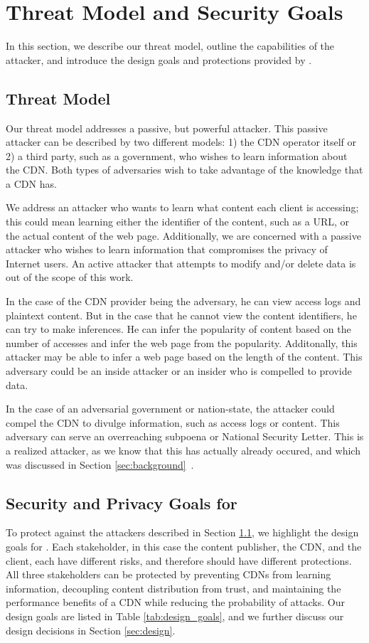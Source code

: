 \section{Threat Model and Security Goals}
\label{sec:threat}
In this section, we describe our threat model, outline the capabilities of the 
attacker, and introduce the design goals and protections provided by \system{}.

\subsection{Threat Model}
\label{sec:attacker}
Our threat model addresses a passive, but powerful attacker.  This passive attacker can 
be described by two different models: 1) the CDN operator itself or 2) a third party, such 
as a government, who wishes to learn information about the CDN. 
Both types of adversaries wish to take advantage of the knowledge that a CDN has.  

We address an attacker who wants to learn what content each client is accessing; this 
could mean learning either the identifier of the content, such as a URL, or the actual 
content of the web page.  Additionally, we are concerned with a passive attacker who 
wishes to learn information that compromises the privacy of Internet 
users.  An active attacker that attempts to modify and/or delete data is out of the 
scope of this work.

In the case of the CDN provider being the adversary, he can view access logs and 
plaintext content. But in the case that he cannot view the content identifiers, he can try to make inferences. He 
can infer the popularity of content based on the number of accesses and infer the web page 
from the popularity. Additonally, this attacker may be able to infer a web page based on the length of the 
content.  This adversary could be an inside attacker or an insider who is 
compelled to provide data. 

In the case of an adversarial government or nation-state, the attacker could compel 
the CDN to divulge information, such as access logs or content.  This adversary can 
serve an overreaching subpoena or National Security Letter.  This is a realized 
attacker, as we know that this has actually already occured, and which was discussed 
in Section \ref{sec:background}~\cite{cloudflare_nsl}.

\subsection{Security and Privacy Goals for \system{}}
\label{sec:goals}
To protect against the attackers described in Section 
\ref{sec:attacker}, we highlight the design goals for \system{}. 
Each stakeholder, in this case the content publisher, the CDN, and the client, each have 
different risks, and therefore should have different protections.  All three stakeholders 
can be protected by preventing CDNs from learning information, decoupling content distribution from trust, and 
maintaining the performance benefits of a CDN while reducing the probability of attacks.  Our design goals are listed in Table \ref{tab:design_goals}, 
and we further discuss our design decisions in Section \ref{sec:design}.

